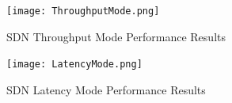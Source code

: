 \begin{figure}[!hbt]
        \centering
        \texttt{[image: ThroughputMode.png]}
        \caption{SDN Throughput Mode Performance Results}
        \label{cnst_tpm}
\end{figure}

\begin{figure}[!hbt]
        \centering
        \texttt{[image: LatencyMode.png]}
        \caption{SDN Latency Mode Performance Results}
        \label{cnst_laten}
\end{figure}